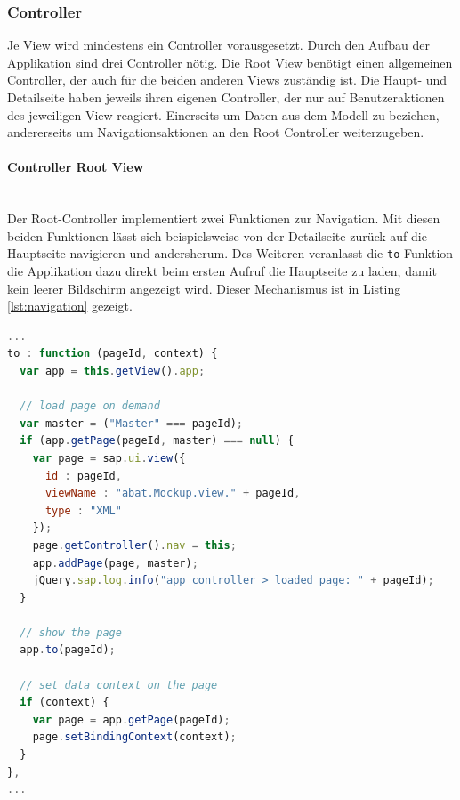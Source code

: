 \subsubsection{Controller}
Je View wird mindestens ein Controller vorausgesetzt. Durch den Aufbau der Applikation sind drei Controller nötig. Die Root View benötigt einen allgemeinen Controller, der auch für die beiden anderen Views zuständig ist. Die Haupt- und Detailseite haben jeweils ihren eigenen Controller, der nur auf Benutzeraktionen des jeweiligen View reagiert. Einerseits um Daten aus dem Modell zu beziehen, andererseits um Navigationsaktionen an den Root Controller weiterzugeben.

\paragraph{Controller Root View}$\;$ \\
Der Root-Controller implementiert zwei Funktionen zur Navigation. Mit diesen beiden Funktionen lässt sich beispielsweise von der Detailseite zurück auf die Hauptseite navigieren und andersherum. Des Weiteren veranlasst die \texttt{to} Funktion die Applikation dazu direkt beim ersten Aufruf die Hauptseite zu laden, damit kein leerer Bildschirm angezeigt wird. Dieser Mechanismus ist in Listing \ref{lst:navigation} gezeigt.

\vspace{1em}
\begin{lstlisting}[language=JavaScript, caption=Navigationsmechanismus, label=lst:navigation]
...
to : function (pageId, context) {
  var app = this.getView().app;

  // load page on demand
  var master = ("Master" === pageId);
  if (app.getPage(pageId, master) === null) {
    var page = sap.ui.view({
      id : pageId,
      viewName : "abat.Mockup.view." + pageId,
      type : "XML"
    });
	page.getController().nav = this;
	app.addPage(page, master);
	jQuery.sap.log.info("app controller > loaded page: " + pageId);
  }

  // show the page
  app.to(pageId);

  // set data context on the page
  if (context) {
    var page = app.getPage(pageId);
    page.setBindingContext(context);
  }
},
...
\end{lstlisting}

